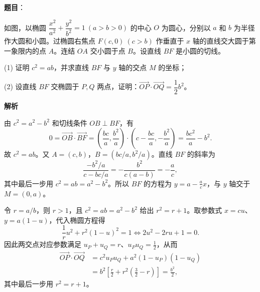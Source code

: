 \begin{answer}

\textbf{题目}：

如图，以椭圆 \(\dfrac{x^2}{a^2}+\dfrac{y^2}{b^2}=1\ (a>b>0)\) 的中心 \(O\) 为圆心，分别以 \(a\) 和 \(b\) 为半径作大圆和小圆。过椭圆右焦点 \(F(c,0)\ (c>b)\) 作垂直于 \(x\) 轴的直线交大圆于第一象限内的点 \(A\)。连结 \(OA\) 交小圆于点 \(B\)。设直线 \(BF\) 是小圆的切线。

(1) 证明 \(c^2=ab\)，并求直线 \(BF\) 与 \(y\) 轴的交点 \(M\) 的坐标；

(2) 设直线 \(BF\) 交椭圆于 \(P,Q\) 两点，证明：\(\overrightarrow{OP}\cdot\overrightarrow{OQ}=\dfrac12b^2\)。
\nopagebreak[4]
\begin{center}\end{center}
\nopagebreak[4]
\textbf{解析}


由 \(c^2=a^2-b^2\) 和切线条件 \(OB\perp BF\)，有
\nopagebreak[4]
\[
0=\overrightarrow{OB}\cdot\overrightarrow{BF}
=\left(\frac{bc}{a},\frac{b^2}{a}\right)\cdot
\left(c-\frac{bc}{a},-\frac{b^2}{a}\right)
=\frac{bc^2}{a}-b^2.
\]
故 \(c^2=ab\)。又 \(A=(c,b)\)，\(B=(bc/a,b^2/a)\)。直线 \(BF\) 的斜率为
\nopagebreak[4]
\[
\frac{-b^2/a}{c-bc/a}=-\frac{b^2}{c(a-b)}=-\frac ac,
\]
其中最后一步用 \(c^2=ab=a^2-b^2\)。所以 \(BF\) 的方程为 \(y=a-\frac acx\)，与 \(y\) 轴交于 \(M=(0,a)\)。


令 \(r=a/b\)，则 \(r>1\)，且 \(c^2=ab=a^2-b^2\) 给出 \(r^2=r+1\)。取参数式 \(x=cu\)、\(y=a(1-u)\)，代入椭圆方程得
\nopagebreak[4]
\[
\frac1r u^2+r^2(1-u)^2=1\iff 2u^2-2ru+1=0.
\]
因此两交点对应参数满足 \(u_P+u_Q=r\)、\(u_Pu_Q=\frac12\)，从而
\nopagebreak[4]
\[
\begin{aligned}
\overrightarrow{OP}\cdot\overrightarrow{OQ}
&=c^2u_Pu_Q+a^2(1-u_P)(1-u_Q)\\
&=b^2\left[\frac r2+r^2\left(\frac32-r\right)\right]
=\frac{b^2}{2},
\end{aligned}
\]
其中最后一步用 \(r^2=r+1\)。



\end{answer}